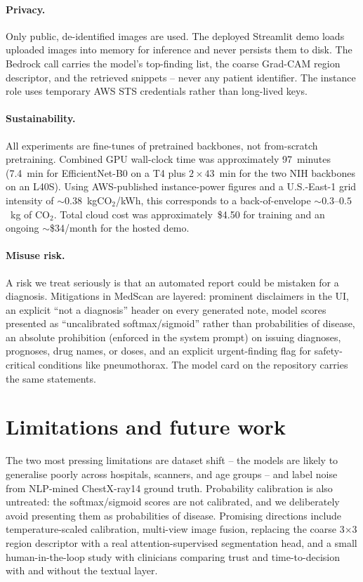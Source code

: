 \documentclass[10pt,journal,onecolumn]{IEEEtran}
\begin{document}
\paragraph{Privacy.} Only public, de-identified images are used. The deployed Streamlit demo loads uploaded images into memory for inference and never persists them to disk. The Bedrock call carries the model's top-finding list, the coarse Grad-CAM region descriptor, and the retrieved snippets -- never any patient identifier. The instance role uses temporary AWS STS credentials rather than long-lived keys.

\paragraph{Sustainability.} All experiments are fine-tunes of pretrained backbones, not from-scratch pretraining. Combined GPU wall-clock time was approximately 97~minutes (7.4~min for EfficientNet-B0 on a T4 plus $2\times 43$~min for the two NIH backbones on an L40S). Using AWS-published instance-power figures and a U.S.-East-1 grid intensity of $\sim 0.38$~kgCO$_2$/kWh, this corresponds to a back-of-envelope $\sim 0.3$--$0.5$~kg of CO$_2$. Total cloud cost was approximately~\$4.50 for training and an ongoing $\sim$\$34/month for the hosted demo.

\paragraph{Misuse risk.} A risk we treat seriously is that an automated report could be mistaken for a diagnosis. Mitigations in MedScan are layered: prominent disclaimers in the UI, an explicit ``not a diagnosis'' header on every generated note, model scores presented as ``uncalibrated softmax/sigmoid'' rather than probabilities of disease, an absolute prohibition (enforced in the system prompt) on issuing diagnoses, prognoses, drug names, or doses, and an explicit urgent-finding flag for safety-critical conditions like pneumothorax. The model card on the repository carries the same statements.

\section{Limitations and future work}\label{sec:limits}

The two most pressing limitations are dataset shift -- the models are likely to generalise poorly across hospitals, scanners, and age groups -- and label noise from NLP-mined ChestX-ray14 ground truth. Probability calibration is also untreated: the softmax/sigmoid scores are not calibrated, and we deliberately avoid presenting them as probabilities of disease. Promising directions include temperature-scaled calibration, multi-view image fusion, replacing the coarse 3$\times$3 region descriptor with a real attention-supervised segmentation head, and a small human-in-the-loop study with clinicians comparing trust and time-to-decision with and without the textual layer.
\end{document}
